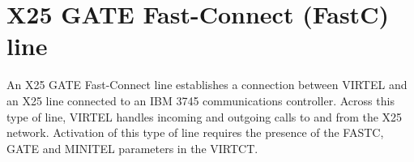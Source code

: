 \documentclass[letterpaper,10pt,english]{sphinxmanual}
\begin{document}
\newpage

\ignorespaces 

\section{X25 GATE Fast-Connect (FastC) line}
\label{\detokenize{connectivity_guide:x25-gate-fast-connect-fastc-line}}\label{\detokenize{connectivity_guide:index-68}}
An X25 GATE Fast-Connect line establishes a connection between VIRTEL and an X25 line connected to an IBM 3745 communications controller. Across this type of line, VIRTEL handles incoming and outgoing calls to and from the X25 network. Activation of this type of line requires the presence of the FASTC, GATE and MINITEL parameters in the VIRTCT.


\ignorespaces 
\end{document}
